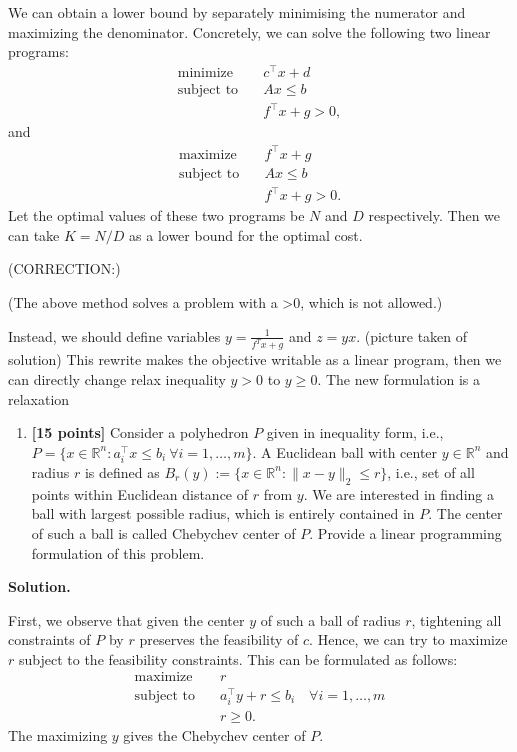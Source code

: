 \documentclass[11pt,letterpaper]{article}
\theoremstyle{definition}
\newcommand{\reals}{\mathbb{R}}
\newcommand{\solution}{\medskip\noindent\textbf{Solution.}\par\medskip}
\begin{document}
We can obtain a lower bound by separately minimising the numerator and maximizing the denominator. 
Concretely, we can solve the following two linear programs:
\begin{align*}
    \text{minimize} \quad & c^\top x + d \\
    \text{subject to} \quad & Ax \leq b \\
    & f^\top x + g > 0,
\end{align*}
and
\begin{align*}
    \text{maximize} \quad & f^\top x + g \\
    \text{subject to} \quad & Ax \leq b \\
    & f^\top x + g > 0. 
\end{align*}
Let the optimal values of these two programs be $N$ and $D$ respectively.
Then we can take $K = N/D$ as a lower bound for the optimal cost.

(CORRECTION:)

(The above method solves a problem with a >0, which is not allowed.)

Instead, we should define variables $y = \frac{1}{f^T x + g}$ and $z=y x$. (picture taken of solution)
This rewrite makes the objective writable as a linear program, then we can directly change relax inequality $y>0$ to $y\geq 0$. 
The new formulation is a relaxation


\begin{enumerate}[resume]
\item \textbf{[15 points]} Consider a polyhedron $P$ given in inequality form, i.e., $P = \{x\in\reals^n : a_i^\top x \leq b_i \ \forall i = 1,\ldots,m\}$. A Euclidean ball with center $y\in\reals^n$ and radius $r$ is defined as $B_r(y) := \{x\in\reals^n : \|x-y\|_2 \leq r\}$, i.e., set of all points within Euclidean distance of $r$ from $y$. We are interested in finding a ball with largest possible radius, which is entirely contained in $P$. The center of such a ball is called Chebychev center of $P$. Provide a linear programming formulation of this problem.
\end{enumerate}

\solution
First, we observe that given the center $y$ of such a ball of radius $r$, tightening all constraints of $P$ by $r$ preserves the feasibility of $c$.
Hence, we can try to maximize $r$ subject to the feasibility constraints.
This can be formulated as follows:
\begin{align*}
    \text{maximize} \quad & r \\
    \text{subject to} \quad & a_i^\top y + r \leq b_i \quad \forall i = 1,\ldots,m \\
    & r \geq 0.
\end{align*}    
The maximizing $y$ gives the Chebychev center of $P$.
\end{document}
